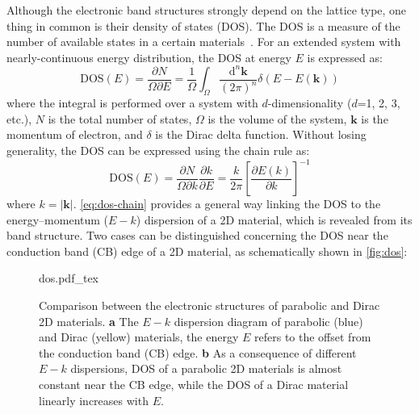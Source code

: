 Although the electronic band structures strongly depend on the lattice
type, one thing in common is their density of states (DOS). The DOS is
a measure of the number of available states in a certain
materials~\autocite{Kittel_2005_introduction_book}. For an extended system
with nearly-continuous energy distribution, the DOS at energy $E$ is
expressed as\autocite{Kittel_2005_introduction_book}:
\begin{equation}
  \label{eq:ch-intro-dos}
  \mathrm{DOS}(E) = \frac{\partial N}{\Omega \partial E} =  \frac{1}{\Omega} {\displaystyle \int_{\Omega}} \frac{\mathrm{d}^{n} \mathbf{k}}{(2 \pi)^{n}}
  \delta(E - E(\mathbf{k}))
\end{equation}
where the integral is performed over a system with $d$-dimensionality
($d$=1, 2, 3, etc.), $N$ is the total number of states, $\Omega$ is
the volume of the system, $\mathbf{k}$ is the momentum of electron,
and $\delta$ is the Dirac delta function. Without losing generality,
the DOS can be expressed using the chain rule as:
\begin{equation}
  \label{eq:dos-chain}
  \mathrm{DOS}(E) = \frac{\partial N}{\Omega \partial k} \frac{\partial k}{\partial E}
               = \frac{k}{2 \pi} \left[\frac{\partial E(k)}{\partial k}\right]^{-1}
\end{equation}
where $k=|\mathbf{k}|$.
%
\autoref{eq:dos-chain} provides a general way linking the DOS to the
energy--momentum ($E-k$) dispersion of a 2D material, which is revealed from its band structure.  Two
cases can be distinguished concerning the DOS near the conduction band
(CB) edge of a 2D material, as schematically shown in \autoref{fig:dos}:
\begin{figure}[h]
  \centering
  {dos.pdf_tex}
  \caption{\label{fig:dos}%
    Comparison between the electronic structures of parabolic and
    Dirac 2D materials. \textbf{a} The $E-k$ dispersion diagram of
    parabolic (blue) and Dirac (yellow) materials, the energy $E$
    refers to the offset from the conduction band (CB) edge.
    \textbf{b} As a consequence of different $E-k$ dispersions, DOS of
    a parabolic 2D materials is almost constant near the CB edge,
    while the DOS of a Dirac material linearly increases with $E$.  %
  }
\end{figure}

